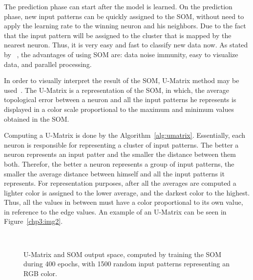 The prediction phase can start after the model is learned. On the prediction phase, new input patterns can be quickly assigned to the \ac{SOM}, without need to apply the learning rate to the winning neuron and his neighbors. Due to the fact that the input pattern will be assigned to the cluster that is mapped by the nearest neuron. Thus, it is very easy and fast to classify new data now. As stated by ~\citet{Liu2012b}, the advantages of using \ac{SOM} are: data noise immunity, easy to visualize data, and parallel processing.

In order to visually interpret the result of the \ac{SOM}, \ac{U-Matrix} method may be used~\citep{Bacao2005}. The \ac{U-Matrix} is a representation of the \ac{SOM}, in which, the average topological error between a neuron and all the input patterns he represents is displayed in a color scale proportional to the maximum and minimum values obtained in the \ac{SOM}. 

Computing a U-Matrix is done by the Algorithm~\ref{alg:umatrix}. Essentially, each neuron is responsible for representing a cluster of input patterns. The better a neuron represents an input patter and the smaller the distance between them both. Therefor, the better a neuron represents a group of input patterns, the smaller the average distance between himself and all the input patterns it represents. 
For representation purposes, after all the averages are computed a lighter color is assigned to the lower average, and the darkest color to the highest. Thus, all the values in between must have a color proportional to its own value, in reference to the edge values. An example of an \ac{U-Matrix} can be seen in Figure~\ref{chp3:img2}.

\begin{figure}[htpb]
  \centering
  \hspace*{0.5cm}
  \\
  \caption{U-Matrix and SOM output space, computed by training the SOM during 400 epochs, with 1500 random input patterns representing an RGB color.}
  \label{fig:umatrix_and_ouputspace}
\end{figure}


